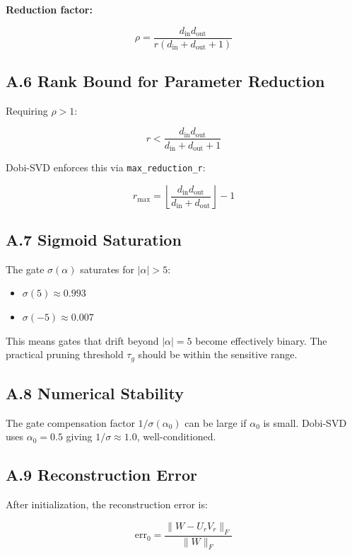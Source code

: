 \textbf{Reduction factor:}

\[
\rho = \frac{d_\text{in} d_\text{out}}{r(d_\text{in} + d_\text{out} + 1)}
\tag{A.5}
\]

\subsection{A.6 Rank Bound for Parameter Reduction}

Requiring $\rho > 1$:

\[
r < \frac{d_\text{in} d_\text{out}}{d_\text{in} + d_\text{out} + 1}
\tag{A.6}
\]

Dobi-SVD enforces this via \texttt{max\_reduction\_r}:

\[
r_\text{max} = \left\lfloor \frac{d_\text{in} d_\text{out}}{d_\text{in} + d_\text{out}} \right\rfloor - 1
\tag{A.7}
\]

\subsection{A.7 Sigmoid Saturation}

The gate $\sigma(\alpha)$ saturates for $|\alpha| > 5$:

\begin{itemize}
\item $\sigma(5) \approx 0.993$
\item $\sigma(-5) \approx 0.007$

\end{itemize}
This means gates that drift beyond $|\alpha| = 5$ become effectively binary. 
The practical pruning threshold $\tau_g$ should be within the sensitive range.

\subsection{A.8 Numerical Stability}

The gate compensation factor $1/\sigma(\alpha_0)$ can be large if 
$\alpha_0$ is small. Dobi-SVD uses $\alpha_0 = 0.5$ giving 
$1/\sigma \approx 1.0$, well-conditioned.

\subsection{A.9 Reconstruction Error}

After initialization, the reconstruction error is:

\[
\text{err}_0 = \frac{\|W - U_r V_r\|_F}{\|W\|_F}
\tag{A.8}
\]

